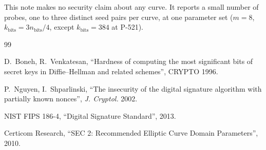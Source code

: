 \documentclass[10pt,a4paper]{article}
\begin{document}
This note makes no security claim about any curve. It reports a small
number of probes, one to three distinct seed pairs per curve, at one
parameter set ($m = 8$, $k_{\text{bits}} = 3 n_{\text{bits}}/4$, except
$k_{\text{bits}} = 384$ at P-521).

\begin{thebibliography}{99}

 D.~Boneh, R.~Venkatesan, ``Hardness of computing
the most significant bits of secret keys in Diffie--Hellman and
related schemes'', CRYPTO 1996.

 P.~Nguyen, I.~Shparlinski, ``The insecurity of
the digital signature algorithm with partially known nonces'',
\emph{J. Cryptol.} 2002.

 NIST FIPS 186-4, ``Digital Signature Standard'',
2013.

 Certicom Research, ``SEC 2: Recommended Elliptic Curve
Domain Parameters'', 2010.

\end{thebibliography}
\end{document}
